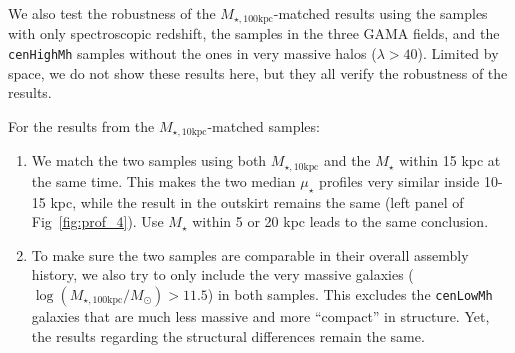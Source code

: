 \documentclass{emulateapj}
\def\rbcg{\texttt{cenHighMh}}
\def\nbcg{\texttt{cenLowMh}}
\def\mstar{{$M_{\star}$}}
\def\minn{{$M_{\star,10\mathrm{kpc}}$}}
\def\mtot{{$M_{\star,100\mathrm{kpc}}$}}
\def\logmtot{{$\log (M_{\star,100\mathrm{kpc}}/M_{\odot})$}}
\def\mden{{$\mu_{\star}$}}
\begin{document}
\begin{CJK*}{UTF8}{gbsn}
\begin{enumerate}
    \end{enumerate}
    
    We also test the robustness of the \mtot{}-matched results using the samples with 
    only spectroscopic redshift, the samples in the three GAMA fields, and the \rbcg{} 
    samples without the ones in very massive halos ($\lambda > 40$).  
    Limited by space, we do not show these results here, but they all verify the 
    robustness of the results. 
    
    For the results from the \minn{}-matched samples: 
    
    \begin{enumerate}
    
        \item
            We match the two samples using both \minn{} and the \mstar{} within 15 kpc 
            at the same time.  
            This makes the two median \mden{} profiles very similar inside 10-15 
            kpc, while the result in the outskirt remains the same (left panel of 
            Fig~\ref{fig:prof_4}).
            Use \mstar{} within 5 or 20 kpc leads to the same conclusion. 
          
        \item 
            To make sure the two samples are comparable in their overall assembly history,
            we also try to only include the very massive galaxies (\logmtot{}$>11.5$)
            in both samples. 
            This excludes the \nbcg{} galaxies that are much less massive and 
            more ``compact'' in structure. 
            Yet, the results regarding the structural differences remain the same. 
          
    \end{enumerate}


\end{CJK*}
\end{document}

